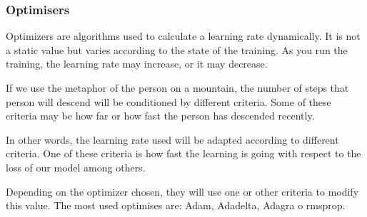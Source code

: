 \subsubsection{Optimisers}


Optimizers are algorithms used to calculate a learning rate dynamically. It is not a static value but varies according to the state of the training. As you run the training, the learning rate may increase, or it may decrease.
\newline

If we use the metaphor of the person on a mountain, the number of steps that person will descend will be conditioned by different criteria. Some of these criteria may be how far or how fast the person has descended recently.
\newline

In other words, the learning rate used will be adapted according to different criteria. One of these criteria is how fast the learning is going with respect to the loss of our model among others.
\newline

Depending on the optimizer chosen, they will use one or other criteria to modify this value. The most used optimises are: Adam\cite{kingma}, Adadelta\cite{zeiler}, Adagra\cite{duchi} o \acrshort{rmsprop}\cite{duchi}.
\newline